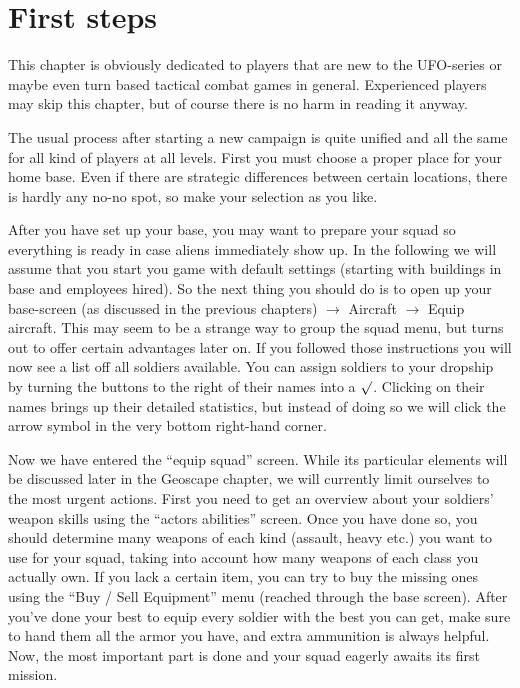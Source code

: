 \section{First steps}
This chapter is obviously dedicated to players that are new to the UFO-series or maybe even turn based tactical combat games in general. Experienced players may skip this chapter, but of course there is no harm in reading it anyway.

The usual process after starting a new campaign is quite unified and all the same for all kind of players at all levels. First you must choose a proper place for your home base. Even if there are strategic differences between certain locations, there is hardly any no-no spot, so make your selection as you like.

After you have set up your base, you may want to prepare your squad so everything is ready in case aliens immediately show up. In the following we will assume that you start you game with default settings (starting with buildings in base and employees hired). So the next thing you should do is to open up your base-screen (as discussed in the previous chapters) 
$\rightarrow$ Aircraft $\rightarrow$ Equip aircraft. This may seem to be a strange way to group the squad menu, but turns out to offer certain advantages later on. If you followed those instructions you will now see a list off all soldiers available. You can assign soldiers to your dropship by turning the  buttons to the right of their names into a $\surd$. Clicking on their names brings up their detailed statistics, but instead of doing so we will click the arrow symbol in the very bottom right-hand corner.

Now we have entered the ``equip squad'' screen. While its particular elements will be discussed later in the Geoscape chapter, we will currently limit ourselves to the most urgent actions. First you need to get an overview about your soldiers' weapon skills using the ``actors abilities'' screen. Once you have done so, you should determine many weapons of each kind (assault, heavy etc.) you want to use for your squad, taking into account how many weapons of each class you actually own. If you lack a certain item, you can try to buy the missing ones using the ``Buy / Sell Equipment'' menu (reached through the base screen). After you've done your best to equip every soldier with the best you can get, make sure to hand them all the armor you have, and extra ammunition is always helpful. Now, the most important part is done and your squad eagerly awaits its first mission.

